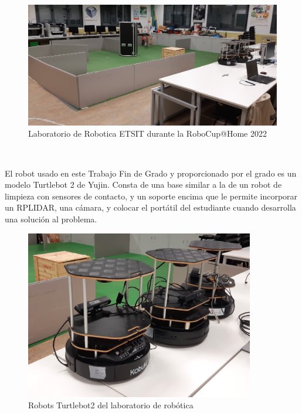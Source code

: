 \begin{figure}[H]
  \begin{center}
    \includegraphics[width=12cm]{imagenes/cap1/laboratorio-robotica.png}
  \end{center}
  \caption[Laboratorio de Robotica ETSIT durante la RoboCup@Home 2022]{Laboratorio de Robotica ETSIT durante la RoboCup@Home 2022}
  \label{fig:laboratorio_robocup}
\end{figure}\

El robot usado en este Trabajo Fin de Grado y proporcionado por el grado es un modelo Turtlebot 2 de Yujin. Consta de una base  similar a la de un robot de limpieza con sensores de contacto, y un soporte encima que le permite incorporar un RPLIDAR, una cámara, y colocar el portátil del estudiante cuando desarrolla una solución al problema.

\begin{figure}[H]
  \begin{center}
    \includegraphics[width=10cm]{imagenes/cap1/robots-turtlebot2-laboratorio.png}
  \end{center}
  \caption[Robots Turtlebot2 del laboratorio de robótica]{Robots Turtlebot2 del laboratorio de robótica}
  \label{fig:robots_laboratorio_robotica}
\end{figure}\

